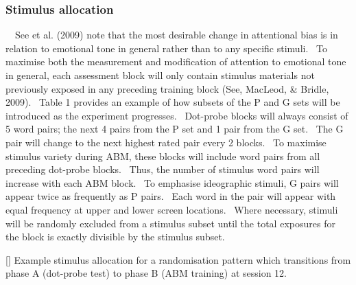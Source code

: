 \documentclass[man,a4paper,biblatex]{apa6}
\begin{document}
\subsubsection[Stimulus allocation]{Stimulus allocation}
\ \ See et al. (2009) note that the most desirable change in attentional bias is in relation to emotional tone in general rather than to any specific stimuli. \ To maximise both the measurement and modification of attention to emotional tone in general, each assessment block will only contain stimulus materials not previously exposed in any preceding training block (See, MacLeod, \& Bridle, 2009). \ Table 1 provides an example of how subsets of the P and G sets will be introduced as the experiment progresses. \ Dot-probe blocks will always consist of 5 word pairs; the next 4 pairs from the P set and 1 pair from the G set. \ The G pair will change to the next highest rated pair every 2 blocks. \ To maximise stimulus variety during ABM, these blocks will include word pairs from all preceding dot-probe blocks. \ Thus, the number of stimulus word pairs will increase with each ABM block. \ To emphasise ideographic stimuli, G pairs will appear twice as frequently as P pairs. \ Each word in the pair will appear with equal frequency at upper and lower screen locations. \ Where necessary, stimuli will be randomly excluded from a stimulus subset until the total exposures for the block is exactly divisible by the stimulus subset.

[]{}
Example stimulus allocation for a randomisation pattern which transitions from phase A (dot-probe test) to phase B (ABM training) at session 12.
\end{document}
